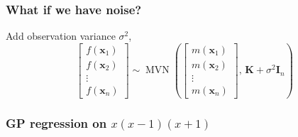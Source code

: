 \documentclass{beamer}
\DeclareMathOperator{\MVN}{MVN}
\begin{document}
\begin{frame}
\end{frame}

\begin{frame}
    \frametitle{What if we have noise?}
    Add observation variance $\sigma^2$, $$\begin{bmatrix}
            f(\mathbf{x}_1) \\ f(\mathbf{x}_2)\\ \vdots\\ f(\mathbf{x}_n)
        \end{bmatrix} \sim
        \MVN\left(\begin{bmatrix}
            m(\mathbf{x}_1) \\ m(\mathbf{x}_2)\\ \vdots\\ m(\mathbf{x}_n)
        \end{bmatrix},\, \mathbf{K} + \sigma^2\mathbf{I}_n\right)$$
\end{frame}

\begin{frame}
    \frametitle{GP regression on $x(x-1)(x+1)$}
\end{frame}
\end{document}
